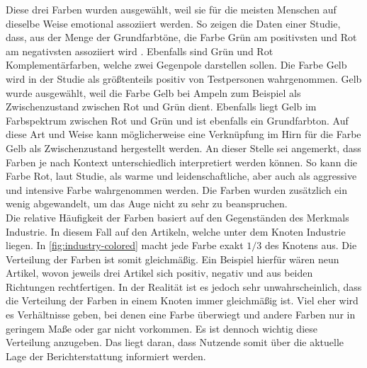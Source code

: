 Diese drei Farben wurden ausgewählt, weil sie für die meisten Menschen auf dieselbe Weise emotional assoziiert werden.
So zeigen die Daten einer Studie, dass, aus der Menge der Grundfarbtöne, die Farbe Grün am positivsten und Rot am negativsten assoziiert wird \cite{color-emotion}.
Ebenfalls sind Grün und Rot Komplementärfarben, welche zwei Gegenpole darstellen sollen.
Die Farbe Gelb wird in der Studie als größtenteils positiv von Testpersonen wahrgenommen.
Gelb wurde ausgewählt, weil die Farbe Gelb bei Ampeln zum Beispiel als Zwischenzustand zwischen Rot und Grün dient.
Ebenfalls liegt Gelb im Farbspektrum zwischen Rot und Grün und ist ebenfalls ein Grundfarbton.
Auf diese Art und Weise kann möglicherweise eine Verknüpfung im Hirn für die Farbe Gelb als Zwischenzustand hergestellt werden.
An dieser Stelle sei angemerkt, dass Farben je nach Kontext unterschiedlich interpretiert werden können.
So kann die Farbe Rot, laut Studie, als warme und leidenschaftliche, aber auch als aggressive und intensive Farbe wahrgenommen werden.
Die Farben wurden zusätzlich ein wenig abgewandelt, um das Auge nicht zu sehr zu beanspruchen.\\

Die relative Häufigkeit der Farben basiert auf den Gegenständen des Merkmals Industrie.
In diesem Fall auf den Artikeln, welche unter dem Knoten Industrie liegen.
In \autoref{fig:industry-colored} macht jede Farbe exakt $1/3$ des Knotens aus.
Die Verteilung der Farben ist somit gleichmäßig.
Ein Beispiel hierfür wären neun Artikel, wovon jeweils drei Artikel sich positiv, negativ und aus beiden Richtungen rechtfertigen.
In der Realität ist es jedoch sehr unwahrscheinlich, dass die Verteilung der Farben in einem Knoten immer gleichmäßig ist.
Viel eher wird es Verhältnisse geben, bei denen eine Farbe überwiegt und andere Farben nur in geringem Maße oder gar nicht vorkommen.
Es ist dennoch wichtig diese Verteilung anzugeben.
Das liegt daran, dass Nutzende somit über die aktuelle Lage der Berichterstattung informiert werden. \\

